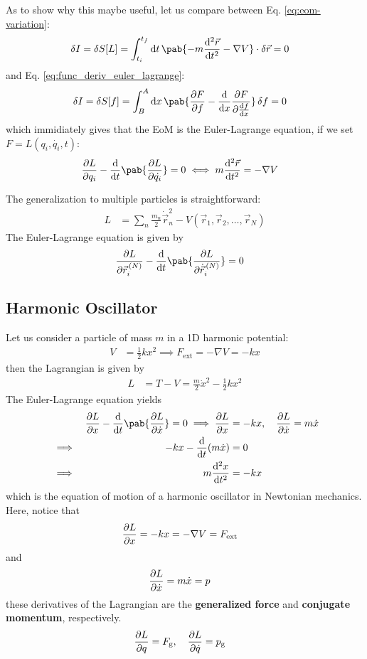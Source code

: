 As to show why this maybe useful, let us compare between Eq. \eqref{eq:eom-variation}:
\begin{align}
  \fdif{I} = \fdif{S}[L] & = \int_{t_i}^{t_f} \odif{t} \, \pab{- m \odv[2]{\vec{r}}{t} - \nabla V} \cdot \fdif{\vec{r}} = 0
\end{align}
and Eq. \eqref{eq:func_deriv_euler_lagrange}:
\begin{align}
  \fdif{I} = \fdif{S}[f] & = \int_B^A \odif{x} \, \pab{\pdv{F}{f} - \odv{}{x} \pdv{F}{\odv{f}{x}}} \fdif{f} = 0
\end{align}
which immidiately gives that the EoM is the Euler-Lagrange equation, if we set $F = L(q_i, \dot{q_i}, t)$:
\begin{align}
  \pdv{L}{q_i} - \odv{}{t} \pab{\pdv{L}{\dot{q_i}}} & = 0 \iff m \odv[2]{\vec{r}}{t} = - \nabla V
\end{align}

The generalization to multiple particles is straightforward:
\begin{align}
  L & = \sum_{n} \frac{m_n}{2} \dot{\vec{r}}_n^2 - V(\vec{r}_1, \vec{r}_2, \ldots, \vec{r}_N)
\end{align}
The Euler-Lagrange equation is given by
\begin{align}
  \pdv{L}{\vec{r}_i^{\, (N)}} - \odv{}{t} \pab{\pdv{L}{\dot{\vec{r}}_i^{\, (N)}}} & = 0
\end{align}

\subsection{Harmonic Oscillator}
Let us consider a particle of mass $m$ in a 1D harmonic potential:
\begin{align}
  V & = \frac{1}{2} k x^2 \implies F_{\text{ext}} = - \nabla V = -k x
\end{align}
then the Lagrangian is given by
\begin{align}
  L & = T - V = \frac{m}{2} \dot{x}^2 - \frac{1}{2} k x^2
\end{align}
The Euler-Lagrange equation yields
\begin{alignat}{2}
   &          & \pdv{L}{x} - \odv{}{t} \pab{\pdv{L}{\dot{x}}} = 0 \implies \pdv{L}{x} & = -k x, \quad \pdv{L}{\dot{x}} = m \dot{x} \\
   & \implies & \quad -k x - \odv{}{t} (m \dot{x})                                    & = 0                                        \\
   & \implies & \quad m \odv[2]{x}{t}                                                 & = -k x
\end{alignat}
which is the equation of motion of a harmonic oscillator in Newtonian mechanics.
Here, notice that
\begin{align}
  \pdv{L}{x} & = -k x = - \nabla V = F_{\text{ext}}
\end{align}
and
\begin{align}
  \pdv{L}{\dot{x}} & = m \dot{x} = p
\end{align}
these derivatives of the Lagrangian are the \textbf{generalized force} and \textbf{conjugate momentum}, respectively.
\begin{align}
  \pdv{L}{q} & = F_{\text{g}}, \quad \pdv{L}{\dot{q}} = p_{\text{g}}
\end{align}
